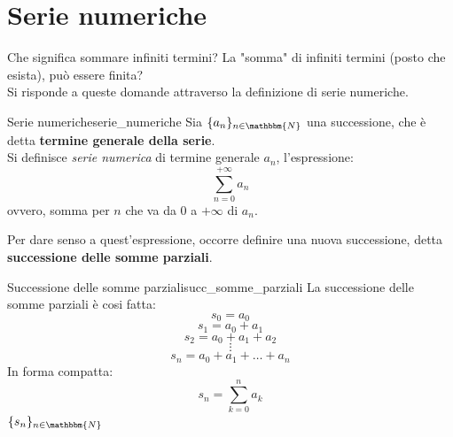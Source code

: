 \documentclass[12pt]{report}
\newcounter{definition}
\newcommand{\nmu}{}
\begin{document}
 	\chapter{Serie numeriche}
 	Che significa sommare infiniti termini? La "somma" di infiniti termini (posto che esista), può essere finita? \\
 	Si risponde a queste domande attraverso la definizione di serie numeriche. \\
 	\begin{definition}{\nmu Serie numeriche}{serie_numeriche}
 		Sia $\{a_n\}_{n \in \mathbbm{N}}$ una successione, che è detta \textbf{termine generale della serie}. \\
 		Si definisce \textit{serie numerica} di termine generale $a_n$, l'espressione: \[
 		\sum_{n = 0}^{+\infty}a_n
 		\]
 		ovvero, somma per $n$ che va da 0 a $+\infty$ di $a_n$.
 	\end{definition}
 	Per dare senso a quest'espressione, occorre definire una nuova successione, detta \textbf{successione delle somme parziali}. \\
 	\begin{definition}{\nmu Successione delle somme parziali}{succ_somme_parziali}
 		La successione delle somme parziali è cosi fatta:
 		\[
 		s_0 = a_0
 		\]
 		\[
 		s_1 = a_0 + a_1
 		\]
 		\[
 		s_2 = a_0 + a_1 + a_2
 		\]
 		\[
 		\vdots
 		\]
 		\[
 		s_n = a_0 + a_1 + \dots + a_n
 		\]
 		In forma compatta: \[
 		s_n = \sum_{k=0}^{n}a_k
 		\]
 		$\{s_n\}_{n \in \mathbbm{N}}$
 	\end{definition}
\end{document}
